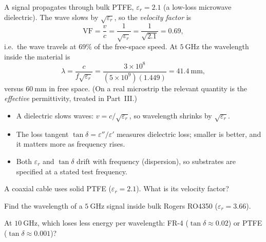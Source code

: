 \begin{workedexample}
A signal propagates through bulk PTFE, $\varepsilon_r = 2.1$ (a low-loss
microwave dielectric). The wave slows by $\sqrt{\varepsilon_r}$, so the
\emph{velocity factor} is
\[ \mathrm{VF} = \frac{v}{c} = \frac{1}{\sqrt{\varepsilon_r}} = \frac{1}{\sqrt{2.1}} = 0.69, \]
i.e.\ the wave travels at $69\%$ of the free-space speed. At $5\ \mathrm{GHz}$
the wavelength inside the material is
\[ \lambda = \frac{c}{f\sqrt{\varepsilon_r}} = \frac{3\times10^{8}}{(5\times10^{9})(1.449)} = 41.4\ \mathrm{mm}, \]
versus $60\ \mathrm{mm}$ in free space. (On a real microstrip the relevant
quantity is the \emph{effective} permittivity, treated in Part~III.)
\end{workedexample}

\begin{keytakeaways}
\begin{itemize}[leftmargin=1.4em,itemsep=2pt]
\item A dielectric slows waves: $v = c/\sqrt{\varepsilon_r}$, so wavelength shrinks by $\sqrt{\varepsilon_r}$.
\item The loss tangent $\tan\delta = \varepsilon''/\varepsilon'$ measures dielectric loss;
smaller is better, and it matters more as frequency rises.
\item Both $\varepsilon_r$ and $\tan\delta$ drift with frequency (dispersion), so
substrates are specified at a stated test frequency.
\end{itemize}
\end{keytakeaways}

\begin{exercises}
\item A coaxial cable uses solid PTFE ($\varepsilon_r = 2.1$). What is its velocity factor?
\item Find the wavelength of a $5\ \mathrm{GHz}$ signal inside bulk Rogers RO4350
($\varepsilon_r = 3.66$).
\item At $10\ \mathrm{GHz}$, which loses less energy per wavelength: FR-4
($\tan\delta \approx 0.02$) or PTFE ($\tan\delta \approx 0.001$)?
\end{exercises}

